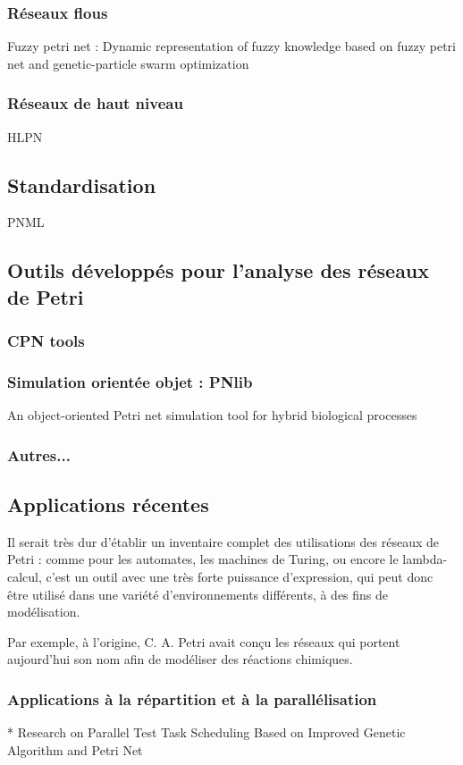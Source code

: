 \subsubsection{Réseaux flous}
Fuzzy petri net : Dynamic representation of fuzzy knowledge based on fuzzy petri net and genetic-particle swarm optimization
\subsubsection{Réseaux de haut niveau}
HLPN

\subsection{Standardisation}
PNML %

\subsection{Outils développés pour l'analyse des réseaux de Petri}
\subsubsection{CPN tools}
\subsubsection{Simulation orientée objet : PNlib}
An object-oriented Petri net simulation tool for hybrid biological processes
\subsubsection{Autres...}

\subsection{Applications récentes}
Il serait très dur d'établir un inventaire complet des utilisations des réseaux de Petri : comme pour les automates, les machines de Turing, ou encore le lambda-calcul, c'est un outil avec une très forte puissance d'expression, qui peut donc être utilisé dans une variété d'environnements différents, à des fins de modélisation.

Par exemple, à l'origine, C. A. Petri avait conçu les réseaux qui portent aujourd'hui son nom afin de modéliser des réactions chimiques.

\subsubsection{Applications à la répartition et à la parallélisation}
* Research on Parallel Test Task Scheduling Based on Improved Genetic Algorithm and Petri Net
